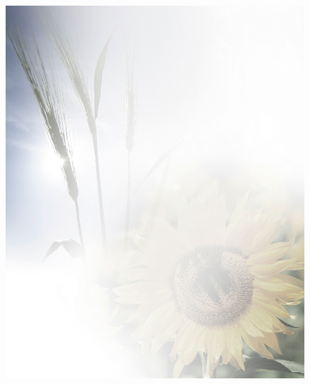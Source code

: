 \documentclass[ngerman,a4paper,11pt]{scrreprt}
\begin{document}
\begin{figure}[H]
\centering
\includegraphics[width=\textwidth,height=.8\textheight]{Bilder/Bilder/./750_0010_7300_Hintergrund_Sonnenblume_Todesanzeige.png}
\end{figure}
\end{document}
